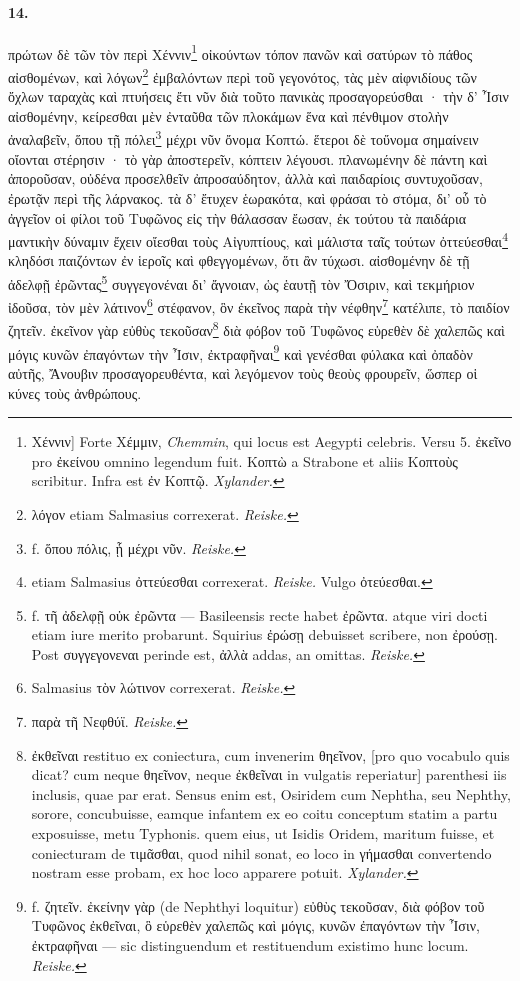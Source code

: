 \documentclass[a4paper, 11pt, oneside, polutonikogreek, german]{article}
\begin{document}
\paragraph{14.}
πρώτων δὲ τῶν τὸν περὶ Χέννιν\footnote{Χέννιν] Forte Χέμμιν, \emph{Chemmin}, qui locus est Aegypti celebris. Versu 5. ἐκεῖνο pro ἐκείνου omnino legendum fuit. Κοπτὼ a Strabone et aliis Κοπτοὺς scribitur. Infra est ἐν Κοπτῷ. \emph{Xylander.}} οἰκούντων τόπον πανῶν καὶ σατύρων τὸ πάθος αἰσθομένων, καὶ λόγων\footnote{λόγον etiam Salmasius correxerat. \emph{Reiske.}} ἐμβαλόντων περὶ τοῦ γεγονότος, τὰς μὲν αἰφνιδίους τῶν ὄχλων ταραχὰς καὶ πτυήσεις ἔτι νῦν διὰ τοῦτο πανικὰς προσαγορεύσθαι · τὴν δ' Ἶσιν αἰσθομένην, κείρεσθαι μὲν ἐνταῦθα τῶν πλοκάμων ἕνα καὶ πένθιμον στολὴν ἀναλαβεῖν, ὅπου τῇ πόλει\footnote{f. ὅπου πόλις, ᾗ μέχρι νῦν. \emph{Reiske.}} μέχρι νῦν ὄνομα Κοπτώ. ἕτεροι δὲ τοὔνομα σημαίνειν οἴονται στέρησιν · τὸ γὰρ ἀποστερεῖν, κόπτειν λέγουσι. πλανωμένην δὲ πάντη καὶ ἀποροῦσαν, οὐδένα προσελθεῖν ἀπροσαύδητον, ἀλλὰ καὶ παιδαρίοις συντυχοῦσαν, ἐρωτᾷν περὶ τῆς λάρνακος. τὰ δ' ἔτυχεν ἑωρακότα, καὶ φράσαι τὸ στόμα, δι' οὗ τὸ ἀγγεῖον οἱ φίλοι τοῦ Τυφῶνος εἰς τὴν θάλασσαν ἔωσαν, ἐκ τούτου τὰ παιδάρια μαντικὴν δύναμιν ἔχειν οἴεσθαι τοὺς Αἰγυπτίους, καὶ μάλιστα ταῖς τούτων ὀττεύεσθαι\footnote{etiam Salmasius ὀττεύεσθαι correxerat. \emph{Reiske.} Vulgo ὀτεύεσθαι.} κληδόσι παιζόντων ἐν ἱεροῖς καὶ φθεγγομένων, ὅτι ἂν τύχωσι. αἰσθομένην δὲ τῇ ἀδελφῇ ἐρῶντας\footnote{f. τῆ ἀδελφῇ οὐκ ἐρῶντα --- Basileensis recte habet ἐρῶντα. atque viri docti etiam iure merito probarunt. Squirius ἐρώσῃ debuisset scribere, non ἐρούσῃ. Post συγγεγονεναι perinde est, ἀλλὰ addas, an omittas. \emph{Reiske.}} συγγεγονέναι δι' ἄγνοιαν, ὡς ἑαυτῇ τὸν Ὄσιριν, καὶ τεκμήριον ἰδοῦσα, τὸν μὲν λάτινον\footnote{Salmasius τὸν λώτινον correxerat. \emph{Reiske.}} στέφανον, ὃν ἐκεῖνος παρὰ τὴν νέφθην\footnote{παρὰ τῆ Νεφθύϊ. \emph{Reiske.}} κατέλιπε, τὸ παιδίον ζητεῖν. ἐκεῖνον γὰρ εὐθὺς τεκοῦσαν\footnote{ἐκθεῖναι restituo ex coniectura, cum invenerim θηεῖνον, [pro quo vocabulo quis dicat? cum neque θηεῖνον, neque ἐκθεῖναι in vulgatis reperiatur] parenthesi iis inclusis, quae par erat. Sensus enim est, Osiridem cum Nephtha, seu Nephthy, sorore, concubuisse, eamque infantem ex eo coitu conceptum statim a partu exposuisse, metu Typhonis. quem eius, ut Isidis Oridem, maritum fuisse, et coniecturam de τιμᾶσθαι, quod nihil sonat, eo loco in γήμασθαι convertendo nostram esse probam, ex hoc loco apparere potuit. \emph{Xylander.}} διὰ φόβον τοῦ Τυφῶνος εὑρεθὲν δὲ χαλεπῶς καὶ μόγις κυνῶν ἐπαγόντων τὴν Ἶσιν, ἐκτραφῆναι\footnote{f. ζητεῖν. ἐκείνην γὰρ (de Nephthyi loquitur) εὐθὺς τεκοῦσαν, διὰ φόβον τοῦ Τυφῶνος ἐκθεῖναι, ὃ εὑρεθὲν χαλεπῶς καὶ μόγις, κυνῶν ἐπαγόντων τὴν Ἶσιν, ἐκτραφῆναι --- sic distinguendum et restituendum existimo hunc locum. \emph{Reiske.}} καὶ γενέσθαι φύλακα καὶ ὀπαδὸν αὐτῆς, Ἄνουβιν προσαγορευθέντα, καὶ λεγόμενον τοὺς θεοὺς φρουρεῖν, ὥσπερ οἱ κύνες τοὺς ἀνθρώπους.
\end{document}
